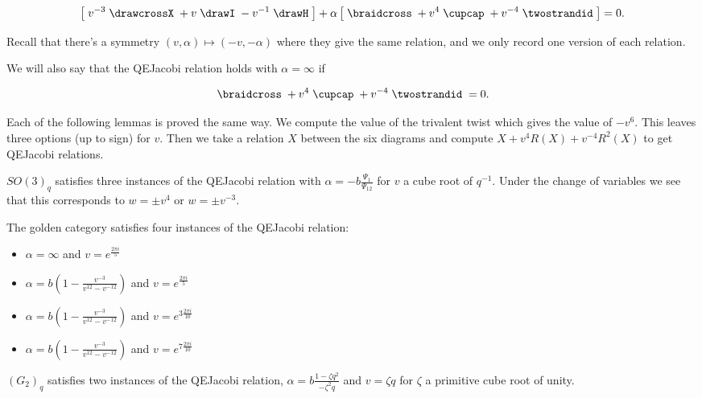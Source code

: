 \documentclass[12pt]{amsart}
\begin{document}
\begin{equation*}
\left[\; v^{-3} \;
\drawcrossX
\;+ v \;
\drawI
\; -v^{-1} \;
 \drawH
\;\right]
 + \alpha
\left[\; \braidcross \;
 + v^{4}\;
\cupcap
\; + v^{-4} \;
 \twostrandid \;
 \right] = 0.
 \end{equation*}
 
Recall that there's a symmetry $(v,\alpha) \mapsto (-v,-\alpha)$ where they give the same relation, and we only record one version of each relation.

We will also say that the QEJacobi relation holds with $\alpha=\infty$ if

\begin{equation*}
\braidcross \;
 + v^{4}\;
\cupcap
\; + v^{-4} \;
 \twostrandid \;= 0.
 \end{equation*}

Each of the following lemmas is proved the same way.  We compute the value of the trivalent twist which gives the value of $-v^6$.  This leaves three options (up to sign) for $v$.  Then we take a relation $X$ between the six diagrams and compute $X+v^{4} R(X)+ v^{-4}R^2(X)$ to get QEJacobi relations. 

\begin{lemma}
$SO(3)_q$ satisfies three instances of the QEJacobi relation with $\alpha = -b \frac{\Psi_1}{\Psi_{12}} $ for $v$ a cube root of $q^{-1}$.  Under the change of variables we see that this corresponds to $w = \pm v^4$ or $w = \pm v^{-3}$.
\end{lemma}

\begin{lemma}
The golden category satisfies four instances of the QEJacobi relation:
 \begin{itemize}
 \item $\alpha=\infty$ and $v = e^{\frac{2 \pi i}{5}}$
  \item $\alpha = b\left(1-\frac{v^{-3}}{v^{12}-v^{-12}}\right)$ and $v = e^{\frac{2 \pi i}{5}}$
 \item $\alpha = b\left(1-\frac{v^{-3}}{v^{12}-v^{-12}}\right)$ and $v = e^{3 \frac{2 \pi i}{10}}$
 \item $\alpha = b\left(1-\frac{v^{-3}}{v^{12}-v^{-12}}\right)$ and $v = e^{7 \frac{2 \pi i}{10}}$ 
 \end{itemize}
 \end{lemma}

\begin{lemma}
$(G_2)_q$ satisfies two instances of the QEJacobi relation, $\alpha = b \frac{1-\zeta q^2}{-\zeta^2 q}$ and $v = \zeta q$ for $\zeta$ a primitive cube root of unity.
\end{lemma}
\end{document}
